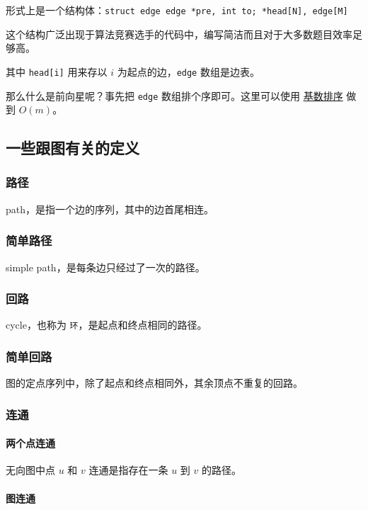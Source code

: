 形式上是一个结构体：\texttt{struct edge {edge *pre, int to;} *head[N], edge[M]}

这个结构广泛出现于算法竞赛选手的代码中，编写简洁而且对于大多数题目效率足够高。

其中 \texttt{head[i]} 用来存以 $i$ 为起点的边，\texttt{edge} 数组是边表。

那么什么是前向星呢？事先把 \texttt{edge} 数组排个序即可。这里可以使用 \href{/basic/sort}{基数排序} 做到 $O(m)$。

\subsection{一些跟图有关的定义}

\subsubsection{路径}

path，是指一个边的序列，其中的边首尾相连。

\subsubsection{简单路径}

simple path，是每条边只经过了一次的路径。

\subsubsection{回路}

cycle，也称为 \texttt{环}，是起点和终点相同的路径。

\subsubsection{简单回路}

图的定点序列中，除了起点和终点相同外，其余顶点不重复的回路。

\subsubsection{连通}

\paragraph{两个点连通}

无向图中点 $u$ 和 $v$ 连通是指存在一条 $u$ 到 $v$ 的路径。

\paragraph{图连通}

